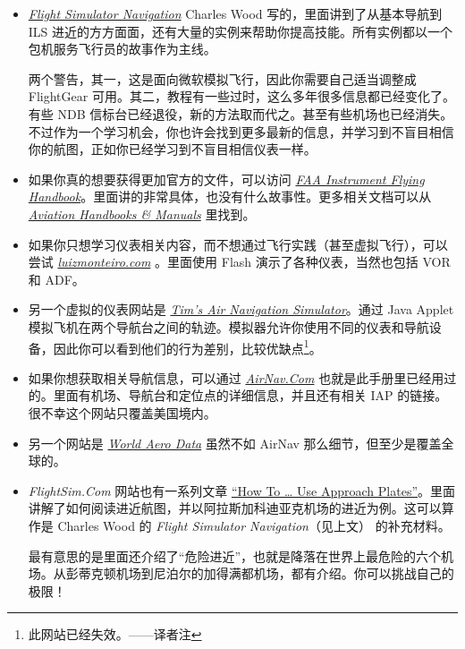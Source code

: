 \begin{itemize}
\item \href{http://www.navfltsm.addr.com}{\textit{Flight Simulator Navigation}} Charles Wood 写的，里面讲到了从基本导航到 ILS 进近的方方面面，还有大量的实例来帮助你提高技能。所有实例都以一个包机服务飞行员的故事作为主线。

两个警告，其一，这是面向微软模拟飞行，因此你需要自己适当调整成 FlightGear 可用。其二，教程有一些过时，这么多年很多信息都已经变化了。有些 NDB 信标台已经退役，新的方法取而代之。甚至有些机场也已经消失。不过作为一个学习机会，你也许会找到更多最新的信息，并学习到不盲目相信你的航图，正如你已经学习到不盲目相信仪表一样。

\item 如果你真的想要获得更加官方的文件，可以访问 \href{http://www.faa.gov/regulations_policies/handbooks_manuals/aviation/media/FAA-H-8083-15B.pdf}{\textit{FAA
      Instrument Flying Handbook}}。里面讲的非常具体，也没有什么故事性。更多相关文档可以从 \href{http://www.faa.gov/regulations_policies/handbooks_manuals/aviation/}{\textit{Aviation
      Handbooks \& Manuals}} 里找到。
\item 如果你只想学习仪表相关内容，而不想通过飞行实践（甚至虚拟飞行），可以尝试 \href{http://www.luizmonteiro.com/Learning.aspx}{\textit{luizmonteiro.com}} 。里面使用 Flash 演示了各种仪表，当然也包括 VOR 和 ADF。
\item 另一个虚拟的仪表网站是 \href{http://www.visi.com/~mim/nav/}{\textit{Tim's Air Navigation
      Simulator}}。通过 Java Applet 模拟飞机在两个导航台之间的轨迹。模拟器允许你使用不同的仪表和导航设备，因此你可以看到他们的行为差别，比较优缺点\footnote{此网站已经失效。——译者注}。
\item 如果你想获取相关导航信息，可以通过 \href{http://www.airnav.com}{\textit{AirNav.Com}} 也就是此手册里已经用过的。里面有机场、导航台和定位点的详细信息，并且还有相关 IAP 的链接。很不幸这个网站只覆盖美国境内。
\item 另一个网站是 \href{http://worldaerodata.com}{\textit{World Aero Data}} 虽然不如 AirNav 那么细节，但至少是覆盖全球的。
\item \textit{FlightSim.Com} 网站也有一系列文章 \href{http://www.flightsim.com/vbfs/content.php?2133}{``How To \ldots{} Use Approach Plates''}。里面讲解了如何阅读进近航图，并以阿拉斯加科迪亚克机场的进近为例。这可以算作是 Charles Wood 的 \textit{Flight Simulator Navigation}（见上文） 的补充材料。

最有意思的是里面还介绍了“危险进近”，也就是降落在世界上最危险的六个机场。从彭蒂克顿机场到尼泊尔的加得满都机场，都有介绍。你可以挑战自己的极限！


\end{itemize}
